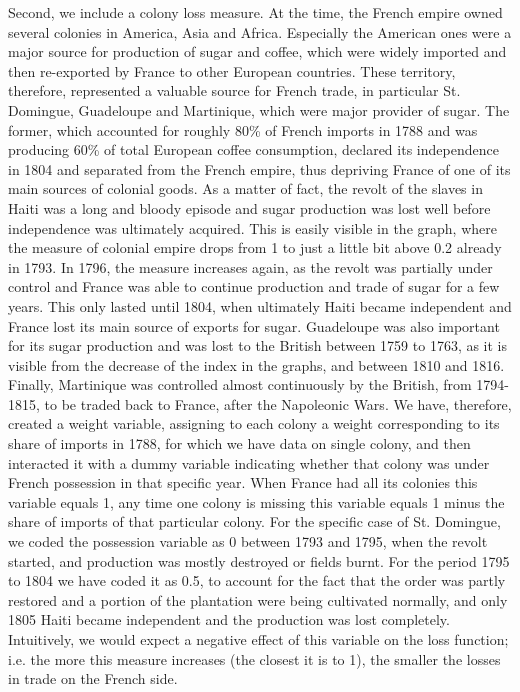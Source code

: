 \documentclass[12pt,a4paper,notitlepage,english]{article}
\begin{document}
Second, we include a colony loss measure.
At the time, the French empire owned several colonies in America, Asia and Africa.
Especially the American ones were a major source for production of sugar and coffee, which were widely imported and then re-exported by France to other European countries.
These territory, therefore, represented a valuable source for French trade, in particular St. Domingue, Guadeloupe and Martinique, which were major provider of sugar.
The former, which accounted for roughly 80\% of French imports in 1788 and was producing 60\% of total European coffee consumption, declared its independence in 1804 and separated from the French empire, thus depriving France of one of its main sources of colonial goods.
As a matter of fact, the revolt of the slaves in Haiti was a long and bloody episode and sugar production was lost well before independence was ultimately acquired.
This is easily visible in the graph, where the measure of colonial empire drops from 1 to just a little bit above 0.2 already in 1793.
In 1796, the measure increases again, as the revolt was partially under control and France was able to continue production and trade of sugar for a few years.
This only lasted until 1804, when ultimately Haiti became independent and France lost its main source of exports for sugar.
Guadeloupe was also important for its sugar production and was lost to the British between 1759 to 1763, as it is visible from the decrease of the index in the graphs, and between 1810 and 1816.
Finally, Martinique was controlled almost continuously by the British, from 1794-1815, to be traded back to France, after the Napoleonic Wars.
We have, therefore, created a weight variable, assigning to each colony a weight corresponding to its share of imports in 1788, for which we have data on single colony, and then interacted it with a dummy variable indicating whether that colony was under French possession in that specific year.
When France had all its colonies this variable equals 1, any time one colony is missing this variable equals 1 minus the share of imports of that particular colony.
For the specific case of St. Domingue, we coded the possession variable as 0 between 1793 and 1795, when the revolt started, and production was mostly destroyed or fields burnt.
For the period 1795 to 1804 we have coded it as 0.5, to account for the fact that the order was partly restored and a portion of the plantation were being cultivated normally, and only 1805 Haiti became independent and the production was lost completely.
Intuitively, we would expect a negative effect of this variable on the loss function; i.e. the more this measure increases (the closest it is to 1), the smaller the losses in trade on the French side.
\end{document}
